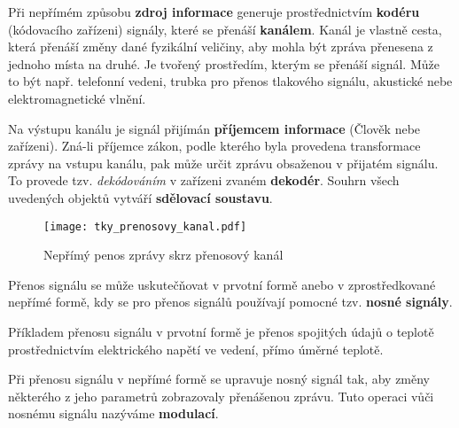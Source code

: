       Při nepřímém způsobu \textbf{zdroj informace} generuje prostřednictvím \textbf{kodéru} 
      (kódovacího zařízeni) signály, které se přenáší \textbf{kanálem}. Kanál je vlastně cesta, 
      která přenáší změny dané fyzikální veličiny, aby mohla být zpráva přenesena z jednoho místa 
      na druhé. Je tvořený prostředím, kterým se přenáší signál. Může to být např. telefonní 
      vedeni, trubka pro přenos tlakového signálu, akustické nebe elektromagnetické vlnění.
      
      Na výstupu kanálu je signál přijímán \textbf{příjemcem informace} (Člověk nebe zařízeni). 
      Zná-li příjemce zákon, podle kterého byla provedena transformace zprávy na vstupu kanálu, pak 
      může určit zprávu obsaženou v přijatém signálu. To provede tzv. \emph{dekódováním} v zařízeni 
      zvaném \textbf{dekodér}. Souhrn všech uvedených objektů vytváří \textbf{sdělovací soustavu}.

      \begin{figure}[ht!]
        \centering
        \texttt{[image: tky\_prenosovy\_kanal.pdf]}
        \caption{Nepřímý penos zprávy skrz přenosový kanál}
        \label{tky:fig002}
      \end{figure}

      Přenos signálu se může uskutečňovat v prvotní formě anebo v zprostředkované nepřímé formě, 
      kdy se pro přenos signálů používají pomocné tzv. \textbf{nosné signály}.
      
      Příkladem přenosu signálu v prvotní formě je přenos spojitých údajů o teplotě     
      prostřednictvím elektrického napětí ve vedení, přímo úměrné teplotě. 
      
      Při přenosu signálu v nepřímé formě se upravuje nosný signál tak, aby změny některého z jeho 
      parametrů zobrazovaly přenášenou zprávu. Tuto operaci vůči nosnému signálu nazýváme 
      \textbf{modulací}.